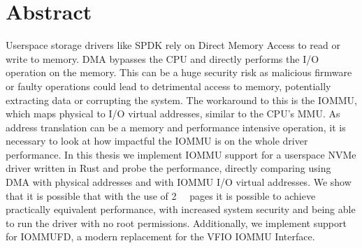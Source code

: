 \chapter{Abstract}

Userspace storage drivers like SPDK rely on Direct Memory Access to read or write to memory. DMA bypasses the CPU and directly performs the I/O operation on the memory. This can be a huge security risk as malicious firmware or faulty operations could lead to detrimental access to memory, potentially extracting data or corrupting the system. The workaround to this is the IOMMU, which maps physical to I/O virtual addresses, similar to the CPU's MMU. As address translation can be a memory and performance intensive operation, it is necessary to look at how impactful the IOMMU is on the whole driver performance.
In this thesis we implement IOMMU support for a userspace NVMe driver written in Rust and probe the performance, directly comparing using DMA with physical addresses and with IOMMU I/O virtual addresses. We show that it is possible that with the use of \qty{2}{\mebi\byte} pages it is possible to achieve practically equivalent performance, with increased system security and being able to run the driver with no root permissions. Additionally, we implement support for IOMMUFD, a modern replacement for the VFIO IOMMU Interface.